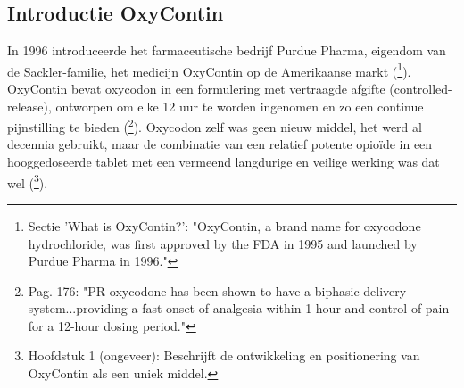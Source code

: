 \documentclass[11pt, a4paper]{report} %
\begin{document}
\subsection{Introductie OxyContin}
In 1996 introduceerde het farmaceutische bedrijf Purdue Pharma, eigendom van de Sackler-familie, het medicijn OxyContin op de Amerikaanse markt (\cite{HealthlineDopesickTruth}\footnote{Sectie 'What is OxyContin?': "OxyContin, a brand name for oxycodone hydrochloride, was first approved by the FDA in 1995 and launched by Purdue Pharma in 1996."}). OxyContin bevat oxycodon in een formulering met vertraagde afgifte (controlled-release), ontworpen om elke 12 uur te worden ingenomen en zo een continue pijnstilling te bieden (\cite{Riley2008OxycodoneReview}\footnote{Pag. 176: "PR oxycodone has been shown to have a biphasic delivery system...providing a fast onset of analgesia within 1 hour and control of pain for a 12-hour dosing period."}). Oxycodon zelf was geen nieuw middel, het werd al decennia gebruikt, maar de combinatie van een relatief potente opioïde in een hooggedoseerde tablet met een vermeend langdurige en veilige werking was dat wel (\cite{Macy2018Dopesick}\footnote{Hoofdstuk 1 (ongeveer): Beschrijft de ontwikkeling en positionering van OxyContin als een uniek middel.}).
\end{document}
